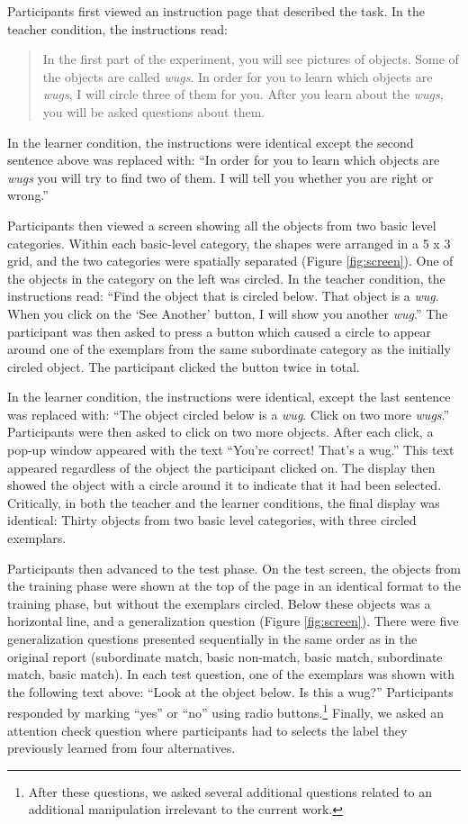 \documentclass[man]{apa2}
\begin{document}
Participants first viewed an instruction page that described the task. In the teacher condition, the instructions read: 
\begin{quote}
In the first part of the experiment, you will see pictures of objects. Some of the objects are called \textit{wugs}. In order for you to learn which objects are \textit{wugs}, I will circle three of them for you. After you learn about the \textit{wugs}, you will be asked questions about them.
\end{quote}
In the learner condition, the instructions were identical except the second sentence above was replaced with: ``In order for you to learn which objects are \textit{wugs} you will try to find two of them. I will tell you whether you are right or wrong.''

Participants then viewed a screen showing all the objects from two basic level categories. Within each basic-level category, the shapes were arranged in a 5 x 3 grid, and the two categories were spatially separated (Figure \ref{fig:screen}). One of the objects in the category on the left was circled. In the teacher condition, the instructions read: ``Find the object that is circled below. That object is a \textit{wug}. When you click on the `See Another' button, I will show you another \textit{wug}.'' The participant was then asked to press a button which caused a circle to appear around one of the exemplars from the same subordinate category as the initially circled object. The participant clicked the button twice in total. 

In the learner condition, the instructions were identical, except the last sentence was replaced with: ``The object circled below is a \textit{wug}. Click on two more \textit{wugs}.'' Participants were then asked to click on two more objects. After each click, a pop-up window appeared with the text ``You're correct! That's a wug.'' This text appeared regardless of the object the participant clicked on. The display then showed the object with a circle around it to indicate that it had been selected. Critically, in both the teacher and the learner conditions, the final display was identical: Thirty objects from two basic level categories, with three circled exemplars.

Participants then advanced to the test phase. On the test screen, the objects from the training phase were shown at the top of the page in an identical format to the training phase, but without the exemplars circled. Below these objects was a horizontal line, and a generalization question (Figure \ref{fig:screen}). There were five generalization questions presented sequentially in the same order as in the original report (subordinate match, basic non-match, basic match, subordinate match, basic match). In each test question, one of the exemplars was shown with the following text above: ``Look at the object below. Is this a wug?'' Participants responded by marking ``yes'' or ``no'' using radio buttons.\footnote{After these questions, we asked several additional questions related to an additional manipulation irrelevant to the current work.} Finally, we asked an attention check question where participants had to selects the label they previously learned from four alternatives.
\end{document}
